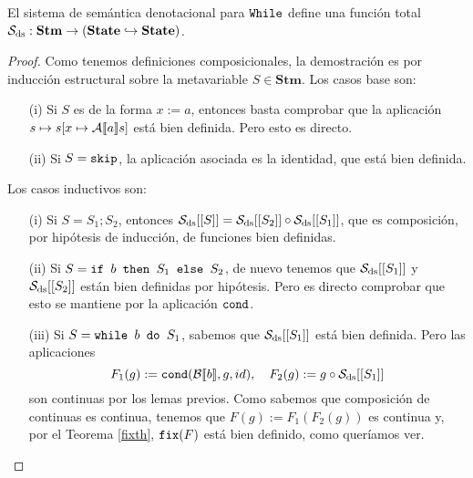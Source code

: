 \begin{theorem}
El sistema de semántica denotacional para $\texttt{While}$ define una función total $\mathcal{S}_{\mathrm{ds}}:\mathbf{Stm}\to (\mathbf{State}\hookrightarrow\mathbf{State})$.
\end{theorem}
\begin{proof}
Como tenemos definiciones composicionales, la demostración es por inducción estructural sobre la metavariable $S \in \mathbf{Stm}$. Los casos base son:
\begin{itemize}
    \item[(i)] Si $S$ es de la forma $x := a$, entonces basta comprobar que la aplicación $s \mapsto s[x \mapsto \mathcal{A}[\![a]\!]s]$ está bien definida. Pero esto es directo.
    \item[(ii)] Si $S = \texttt{skip}$, la aplicación asociada es la identidad, que está bien definida. 
\end{itemize}
Los casos inductivos son:
\begin{itemize}
    \item[(i)] Si $S = S_1;S_2$, entonces $\mathcal{S}_{\mathrm{ds}}[[S]] = \mathcal{S}_{\mathrm{ds}}[[S_2]]\circ \mathcal{S}_{\mathrm{ds}}[[S_1]]$, que es composición, por hipótesis de inducción, de funciones bien definidas.
    \item[(ii)] Si $S = \texttt{if }b \texttt{ then }S_1 \texttt{ else }S_2$, de nuevo tenemos que $\mathcal{S}_{\mathrm{ds}}[[S_1]]$ y $\mathcal{S}_{\mathrm{ds}}[[S_2]]$ están bien definidas por hipótesis. Pero es directo comprobar que esto se mantiene por la aplicación $\texttt{cond}$.
    \item[(iii)] Si $S= \texttt{while }b \texttt{ do }S_1$, sabemos que $\mathcal{S}_{\mathrm{ds}}[[S_1]]$ está bien definida. Pero las aplicaciones
    $$F_1(g) := \texttt{cond}(\mathcal{B}[\![b]\!], g, id), \quad F_2(g) := g \circ \mathcal{S}_{\mathrm{ds}}[[S_1]]$$
    son continuas por los lemas previos. Como sabemos que composición de continuas es continua, tenemos que $F(g) := F_1(F_2(g))$ es continua y, por el Teorema \ref{fixth}, $\texttt{fix}(F)$ está bien definido, como queríamos ver.
\end{itemize}
\end{proof}

